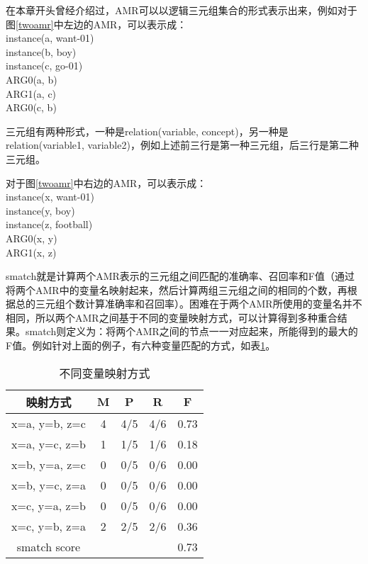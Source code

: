 \documentclass[master, winfont]{njuthesis}
\begin{document}
在本章开头曾经介绍过，AMR可以以逻辑三元组集合的形式表示出来，例如对于图\ref{twoamr}中左边的AMR，可以表示成：\\
instance(a, want-01) \^ \\
instance(b, boy) \^ \\
instance(c, go-01) \^ \\
ARG0(a, b) \^ \\
ARG1(a, c) \^ \\
ARG0(c, b)

三元组有两种形式，一种是relation(variable, concept)，另一种是relation(variable1, variable2)，例如上述前三行是第一种三元组，后三行是第二种三元组。

对于图\ref{twoamr}中右边的AMR，可以表示成：\\
instance(x, want-01) \^ \\
instance(y, boy) \^ \\
instance(z, football) \^ \\
ARG0(x, y)\^ \\
ARG1(x, z)

smatch就是计算两个AMR表示的三元组之间匹配的准确率、召回率和F值（通过将两个AMR中的变量名映射起来，然后计算两组三元组之间的相同的个数，再根据总的三元组个数计算准确率和召回率）。困难在于两个AMR所使用的变量名并不相同，所以两个AMR之间基于不同的变量映射方式，可以计算得到多种重合结果。smatch则定义为：将两个AMR之间的节点一一对应起来，所能得到的最大的F值。例如针对上面的例子，有六种变量匹配的方式，如表\ref{smatch_table}。

\begin{table}[!htbp]
\begin{center}
\begin{tabular}{c|c|c|c|c}
\hline {映射方式} & {M} & {P} & {R} & {F} \\
\hline x=a, y=b, z=c & 4 & 4/5 & 4/6 & 0.73 \\
\hline x=a, y=c, z=b & 1 & 1/5 & 1/6 & 0.18 \\
\hline x=b, y=a, z=c & 0 & 0/5 & 0/6 & 0.00 \\
\hline x=b, y=c, z=a & 0 & 0/5 & 0/6 & 0.00 \\
\hline x=c, y=a, z=b & 0 & 0/5 & 0/6 & 0.00 \\
\hline x=c, y=b, z=a & 2 & 2/5 & 2/6 & 0.36 \\
\hline smatch score & \multicolumn{4}{r}{0.73}\\
\hline
\end{tabular}
\end{center}
\caption{\label{smatch_table} 不同变量映射方式}
\end{table}
\end{document}
